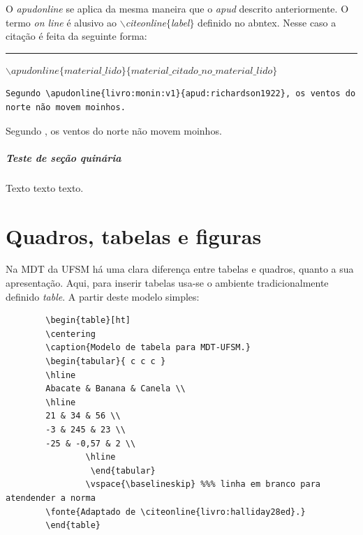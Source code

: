 \documentclass[oneside,openright,12pt]{ufsm_2015} %
\begin{document}
      \par O \textit{apudonline} se aplica da mesma maneira que o \textit{apud} descrito anteriormente. O termo \textit{on line} é alusivo ao \textit{$\backslash$citeonline$\{$label$\}$} definido no abntex. Nesse caso a citação é feita da seguinte forma:
      \begin{center}
      \rule{0.5\textwidth}{1pt}
            $\backslash apudonline\{material\_lido\}\{material\_citado\_no\_material\_lido\}$ \\
	    \end{center}

 \begin{verbatim}
Segundo \apudonline{livro:monin:v1}{apud:richardson1922}, os ventos do
norte não movem moinhos.
\end{verbatim}

            Segundo , os ventos do norte não movem moinhos.

       \paragraph{Teste de seção quinária}
       
       
       \par Texto texto texto.
       
       
         \chapter{Quadros, tabelas e figuras}
         
         \par Na MDT da UFSM há uma clara diferença entre tabelas e quadros, quanto a sua apresentação. Aqui, para inserir tabelas usa-se o ambiente tradicionalmente definido \textit{table}. A partir deste modelo simples:
         

        
        
         \begin{verbatim}
		\begin{table}[ht]
		\centering
		\caption{Modelo de tabela para MDT-UFSM.}
		\begin{tabular}{ c c c }
		\hline
		Abacate & Banana & Canela \\
		\hline
		21 & 34 & 56 \\
		-3 & 245 & 23 \\
		-25 & -0,57 & 2 \\
                \hline
                 \end{tabular}
                \vspace{\baselineskip} %%% linha em branco para atendender a norma
		\fonte{Adaptado de \citeonline{livro:halliday28ed}.}
		\end{table}
	  \end{verbatim}
         
\end{document}
